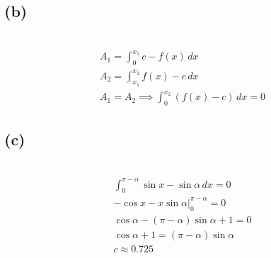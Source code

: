 \documentclass[12pt]{article}
\newcommand{\subproblem}[1]{\subsection{(#1)} \,}
\begin{document}
\subproblem{b}
\begin{gather*}
    A_1 = \int_{0}^{x_1} c - f(x) \, dx\\
    A_2 = \int_{x_1}^{x_2} f(x) - c \, dx\\
    A_1=A_2 \implies \boxed{\int_0^{x_2}(f(x) - c) \, dx=0}
\end{gather*}

\subproblem{c}
\begin{gather*}
    \int_0^{\pi-\alpha} \sin x - \sin \alpha \, dx=0\\
    -\cos x -x\sin \alpha \Big|_0^{\pi-\alpha } =0\\
    \cos \alpha -(\pi -\alpha ) \sin \alpha +1=0\\
    \boxed{\cos \alpha +1=(\pi -\alpha )\sin \alpha }\\
    \boxed{c\approx 0.725}
\end{gather*}
\end{document}
